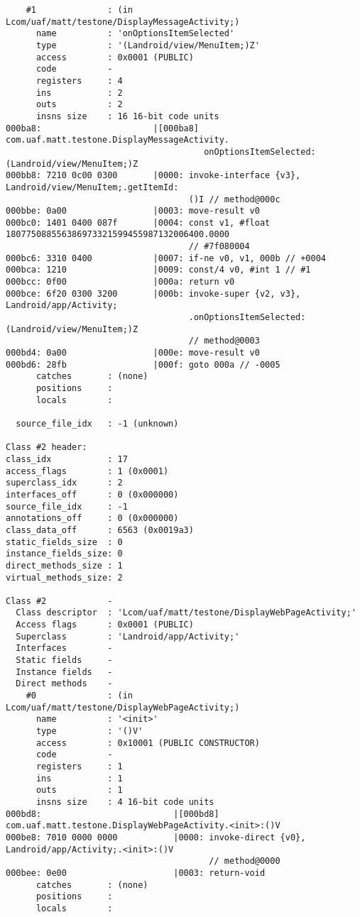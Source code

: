\begin{lstlisting}
    #1              : (in Lcom/uaf/matt/testone/DisplayMessageActivity;)
      name          : 'onOptionsItemSelected'
      type          : '(Landroid/view/MenuItem;)Z'
      access        : 0x0001 (PUBLIC)
      code          -
      registers     : 4
      ins           : 2
      outs          : 2
      insns size    : 16 16-bit code units
000ba8:                      |[000ba8] com.uaf.matt.testone.DisplayMessageActivity.
                                       onOptionsItemSelected:(Landroid/view/MenuItem;)Z
000bb8: 7210 0c00 0300       |0000: invoke-interface {v3}, Landroid/view/MenuItem;.getItemId:
                                    ()I // method@000c
000bbe: 0a00                 |0003: move-result v0
000bc0: 1401 0400 087f       |0004: const v1, #float 180775088556386973321599455987132006400.0000
                                    // #7f080004
000bc6: 3310 0400            |0007: if-ne v0, v1, 000b // +0004
000bca: 1210                 |0009: const/4 v0, #int 1 // #1
000bcc: 0f00                 |000a: return v0
000bce: 6f20 0300 3200       |000b: invoke-super {v2, v3}, Landroid/app/Activity;
                                    .onOptionsItemSelected:(Landroid/view/MenuItem;)Z
                                    // method@0003
000bd4: 0a00                 |000e: move-result v0
000bd6: 28fb                 |000f: goto 000a // -0005
      catches       : (none)
      positions     :
      locals        :

  source_file_idx   : -1 (unknown)

Class #2 header:
class_idx           : 17
access_flags        : 1 (0x0001)
superclass_idx      : 2
interfaces_off      : 0 (0x000000)
source_file_idx     : -1
annotations_off     : 0 (0x000000)
class_data_off      : 6563 (0x0019a3)
static_fields_size  : 0
instance_fields_size: 0
direct_methods_size : 1
virtual_methods_size: 2

Class #2            -
  Class descriptor  : 'Lcom/uaf/matt/testone/DisplayWebPageActivity;'
  Access flags      : 0x0001 (PUBLIC)
  Superclass        : 'Landroid/app/Activity;'
  Interfaces        -
  Static fields     -
  Instance fields   -
  Direct methods    -
    #0              : (in Lcom/uaf/matt/testone/DisplayWebPageActivity;)
      name          : '<init>'
      type          : '()V'
      access        : 0x10001 (PUBLIC CONSTRUCTOR)
      code          -
      registers     : 1
      ins           : 1
      outs          : 1
      insns size    : 4 16-bit code units
000bd8:                          |[000bd8] com.uaf.matt.testone.DisplayWebPageActivity.<init>:()V
000be8: 7010 0000 0000           |0000: invoke-direct {v0}, Landroid/app/Activity;.<init>:()V
                                        // method@0000
000bee: 0e00                     |0003: return-void
      catches       : (none)
      positions     :
      locals        :


\end{lstlisting}
